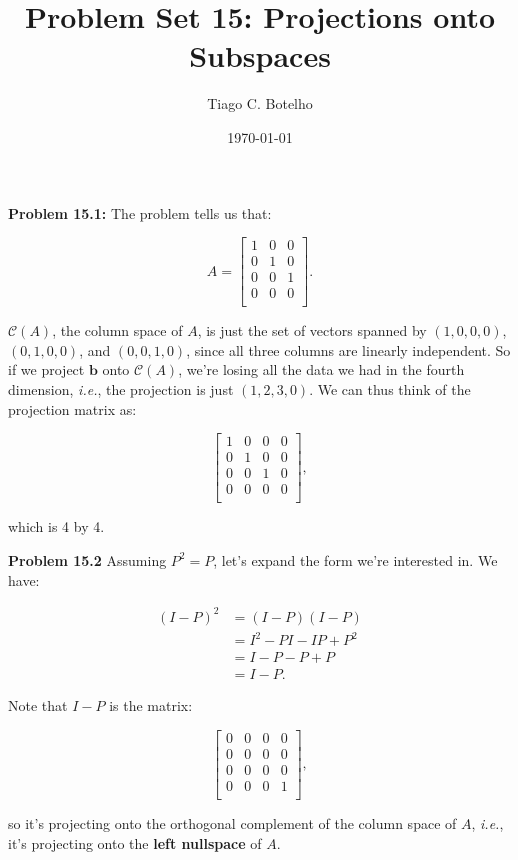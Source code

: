 \documentclass{article}
\title{Problem Set 15: Projections onto Subspaces}
\author{Tiago C. Botelho}
\date{\today}
\begin{document}
\maketitle

\noindent \textbf{Problem 15.1:} The problem tells us that:

\[
A = \begin{bmatrix}
1 & 0 & 0\\
0 & 1 & 0\\
0 & 0 & 1\\
0 & 0 & 0\\
\end{bmatrix}.
\]

$\mathcal{C}(A)$, the column space of $A$, is just the set of vectors spanned by $(1, 0, 0, 0)$, $(0, 1, 0, 0)$, and $(0, 0, 1, 0)$, since all three columns are linearly independent. So if we project $\mathbf{b}$ onto $\mathcal{C}(A)$, we're losing all the data we had in the fourth dimension, \textit{i.e.}, the projection is just $(1, 2, 3, 0)$. We can thus think of the projection matrix as:

\[
\begin{bmatrix}
1 & 0 & 0 & 0\\
0 & 1 & 0 & 0\\
0 & 0 & 1 & 0\\
0 & 0 & 0 & 0\\
\end{bmatrix},
\]

which is 4 by 4.

\noindent \textbf{Problem 15.2} Assuming $P^{2} = P$, let's expand the form we're interested in. We have:

\begin{align*}
(I - P)^{2} &= (I - P)(I - P)\\
&= I^{2} - PI - IP + P^{2}\\
&= I - P - P + P\\
&= I - P.
\end{align*}

Note that $I - P$ is the matrix:

\[
\begin{bmatrix}
0 & 0 & 0 & 0\\
0 & 0 & 0 & 0\\
0 & 0 & 0 & 0\\
0 & 0 & 0 & 1\\
\end{bmatrix},
\]

so it's projecting onto the orthogonal complement of the column space of $A$, \textit{i.e.}, it's projecting onto the \textbf{left nullspace} of $A$.
\end{document}
